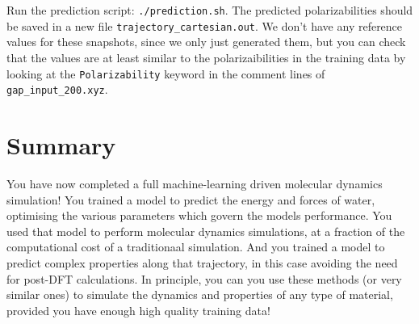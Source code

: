 \documentclass{article}
\begin{document}
Run the prediction script: \verb|./prediction.sh|. The predicted polarizabilities should be saved in a new file \verb|trajectory_cartesian.out|. We don't have any reference values for these snapshots, since we only just generated them, but you can check that the values are at least similar to the polarizaibilities in the training data by looking at the \verb|Polarizability| keyword in the comment lines of \verb|gap_input_200.xyz|.


\section{Summary}
You have now completed a full machine-learning driven molecular dynamics simulation! You trained a model to predict the energy and forces of water, optimising the various parameters which govern the models performance. You used that model to perform molecular dynamics simulations, at a fraction of the computational cost of a traditionaal simulation. And you trained a model to predict complex properties along that trajectory, in this case avoiding the need for post-DFT calculations. In principle, you can you use these methods (or very similar ones) to simulate the dynamics and properties of any type of material, provided you have enough high quality training data!
\end{document}
